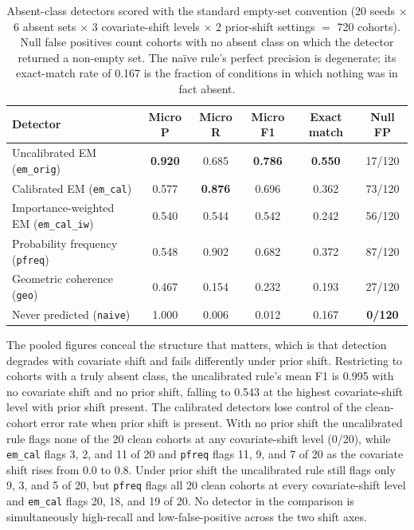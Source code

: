 \documentclass[11pt,a4paper]{article}
\begin{document}
\begin{table}[H]
\centering
\caption{Absent-class detectors scored with the standard empty-set convention
(20 seeds $\times$ 6 absent sets $\times$ 3 covariate-shift levels $\times$ 2 prior-shift settings
$=$ 720 cohorts). Null false positives count cohorts with no absent class on which the detector
returned a non-empty set. The na\"ive rule's perfect precision is
degenerate; its exact-match rate of 0.167 is the fraction of conditions in which nothing was in fact absent.}
\label{tab:detector_v2}
\begin{tabular}{lccccc}
\toprule
\textbf{Detector} & \textbf{Micro P} & \textbf{Micro R} & \textbf{Micro F1} &
\textbf{Exact match} & \textbf{Null FP} \\
\midrule
Uncalibrated EM (\texttt{em\_orig})        & \textbf{0.920} & 0.685 & \textbf{0.786} & \textbf{0.550} & 17/120 \\
Calibrated EM (\texttt{em\_cal})           & 0.577 & \textbf{0.876} & 0.696 & 0.362 & 73/120 \\
Importance-weighted EM (\texttt{em\_cal\_iw}) & 0.540 & 0.544 & 0.542 & 0.242 & 56/120 \\
Probability frequency (\texttt{pfreq})     & 0.548 & 0.902 & 0.682 & 0.372 & 87/120 \\
Geometric coherence (\texttt{geo})         & 0.467 & 0.154 & 0.232 & 0.193 & 27/120 \\
Never predicted (\texttt{naive})           & 1.000 & 0.006 & 0.012 & 0.167 & \textbf{0/120} \\
\bottomrule
\end{tabular}
\end{table}

The pooled figures conceal the structure that matters, which is that detection degrades with
covariate shift and fails differently under prior shift. Restricting to cohorts with a truly absent
class, the uncalibrated rule's mean F1 is 0.995 with no covariate shift and no prior shift, falling
to 0.543 at the highest covariate-shift level with prior shift present. The calibrated detectors
lose control of the clean-cohort error rate when prior shift is present. With no prior shift the
uncalibrated rule flags none of the 20 clean cohorts at any covariate-shift level (0/20), while
\texttt{em\_cal} flags 3, 2, and 11 of 20 and \texttt{pfreq} flags 11, 9, and 7 of 20 as the
covariate shift rises from 0.0 to 0.8. Under prior shift the uncalibrated rule still flags only 9,
3, and 5 of 20, but \texttt{pfreq} flags all 20 clean cohorts at every covariate-shift level and
\texttt{em\_cal} flags 20, 18, and 19 of 20. No detector in the comparison is simultaneously
high-recall and low-false-positive across the two shift axes.
\end{document}
